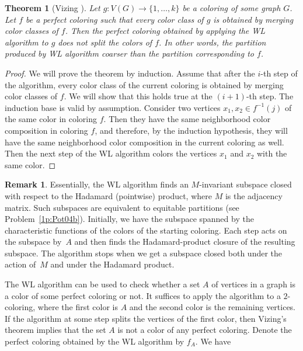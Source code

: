 \documentclass[11pt]{article}
\newtheorem{theorem}{Theorem}[section]
\theoremstyle{definition}
\newtheorem{remark}{Remark}[section]
\begin{document}
\begin{theorem}[Vizing \cite{Vizing}]\label{th:Vizing}
Let $g:V(G)\rightarrow\{1,\ldots,k\}$ be a coloring of some graph $G$.
Let $f$ be a perfect coloring such that every color class of $g$ is obtained by merging color classes of $f$.
Then the perfect coloring obtained by
applying the WL algorithm to $g$ does not split the colors of $f$. In other words, the partition produced  by WL algorithm coarser than the partition corresponding to $f$. 
\end{theorem}
\begin{proof} We will prove the theorem by induction.
Assume that after the $i$-th step of the algorithm, every color class of the current coloring is obtained by merging color classes of $f$.
We will show that this holds true at the $(i+1)$-th step.
The induction base is valid by assumption.
Consider two vertices $x_1,x_2\in f^{-1}(j)$ of the same color in
coloring $f$.
Then they have the same neighborhood color composition  in coloring $f$, and therefore, by the induction hypothesis,
they will have the same neighborhood color composition in the current coloring as well.
Then the next step of the WL algorithm colors the vertices $x_1$ and
$x_2$ with the same color. \end{proof}


\begin{remark}
Essentially, the WL algorithm
finds an $M$-invariant subspace
closed with respect to the Hadamard (pointwise) product, where $M$ is the adjacency matrix.
Such subspaces are equivalent to equitable partitions (see Problem~\ref{1p:Pot04b}).
Initially, we have the subspace spanned by the characteristic functions of the colors of the starting coloring.
Each step acts on the subspace by~$A$
and then finds %
the Hadamard-product closure of the resulting subspace. 
The algorithm stops when we get a subspace closed both under the action of~$M$ and under the Hadamard product.
\end{remark}









The WL algorithm can be used to check whether a set $A$ of vertices in a graph
is a color of some perfect coloring or not. It suffices to apply
the algorithm to a $2$-coloring, where the first  color is $A$ and the second color is  the remaining vertices. If the algorithm at some step
splits the vertices of the first color, then Vizing's theorem implies
that the set $A$ is not a color of any perfect
coloring.
Denote the perfect coloring obtained by the WL algorithm
by $f_A$. We have
\end{document}
